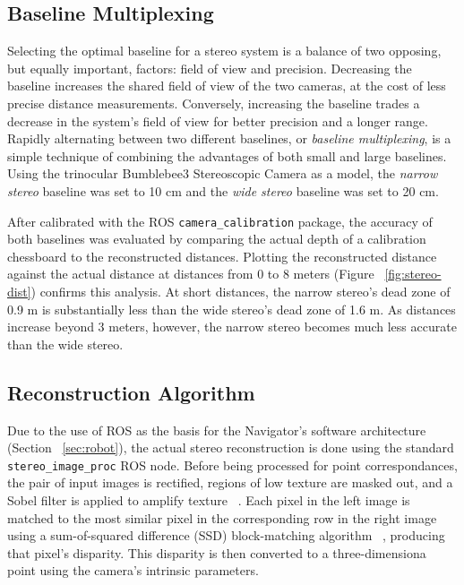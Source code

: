 \documentclass[11pt,twocolumn]{article}
\begin{document}
\subsection{Baseline Multiplexing}
\label{sec:stereo-mux}
Selecting the optimal baseline for a stereo system is a balance of two
opposing, but equally important, factors: field of view and precision.
Decreasing the baseline increases the shared field of view of the two cameras,
at the cost of less precise distance measurements. Conversely, increasing the
baseline trades a decrease in the system's field of view for better precision
and a longer range. Rapidly alternating between two different baselines, or
\textit{baseline multiplexing}, is a simple technique of combining the
advantages of both small and large baselines. Using the trinocular Bumblebee3
Stereoscopic Camera as a model, the \textit{narrow stereo} baseline was set to
10 cm and the \textit{wide stereo} baseline was set to 20 cm.

\begin{figure*}
	\centering
	\caption{
		Reconstructed point cloud using stereo multiplexing. Differences in the
		camera's rectification and reconstruction accuracy cause a small
		rotation in the reconstructed point cloud.
	}
	\label{fig:stereo-dist}
\end{figure*}

After calibrated with the ROS \texttt{camera\_calibration} package, the
accuracy of both baselines was evaluated by comparing the actual depth of a
calibration chessboard to the reconstructed distances. Plotting the
reconstructed distance against the actual distance at distances from 0 to 8
meters (Figure ~\ref{fig:stereo-dist}) confirms this analysis. At short
distances, the narrow stereo's dead zone of 0.9 m is substantially less than
the wide stereo's dead zone of 1.6 m. As distances increase beyond 3 meters,
however, the narrow stereo becomes much less accurate than the wide stereo.

\subsection{Reconstruction Algorithm}
\label{sec:stereo-algo}
Due to the use of ROS as the basis for the Navigator's software architecture
(Section ~\ref{sec:robot}), the actual stereo reconstruction is done using the
standard \texttt{stereo\_image\_proc} ROS node. Before being processed for
point correspondances, the pair of input images is rectified, regions of low
texture are masked out, and a Sobel filter is applied to amplify texture
~\cite{stereo}. Each pixel in the left image is matched to the most similar
pixel in the corresponding row in the right image using a sum-of-squared
difference (SSD) block-matching algorithm ~\cite{stereo}, producing that
pixel's disparity. This disparity is then converted to a three-dimensiona point
using the camera's intrinsic parameters.
\end{document}

